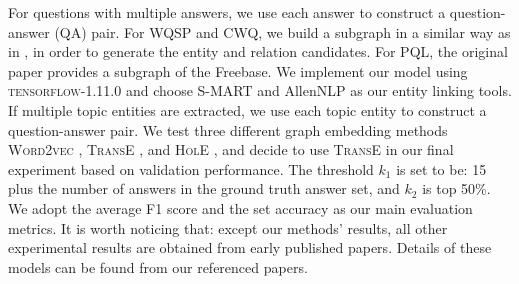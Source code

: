 For questions with multiple answers, we use each answer to construct a question-answer (QA) pair. For WQSP and CWQ, we build a subgraph in a similar way as in \cite{DBLP:conf/emnlp/SunDZMSC18}, in order to generate the entity and relation candidates. For PQL, the original paper provides a subgraph of the Freebase. We implement our model using \textsc{tensorflow-1.11.0} and choose S-MART \cite{DBLP:journals/corr/YangC16a} and AllenNLP \cite{Gardner2017AllenNLP} as our entity linking tools. %
If multiple topic entities are extracted, we use each topic entity to construct a question-answer pair. We test three different graph embedding methods \textsc{Word2vec} \cite{DBLP:journals/corr/abs-1301-3781}, \textsc{TransE} \cite{DBLP:conf/nips/BordesUGWY13}, and \textsc{HolE} \cite{DBLP:journals/corr/TrouillonN17}, and decide to use \textsc{TransE} in our final experiment based on validation performance. The threshold $k_1$ is set to be: 15 plus the number of answers in the ground truth answer set, and $k_2$ is top 50\%. We adopt the average F1 score and the set accuracy as our main evaluation metrics. %
It is worth noticing that: except our methods' results, all other experimental results are obtained from early published papers. Details of these models can be found from our referenced papers.




